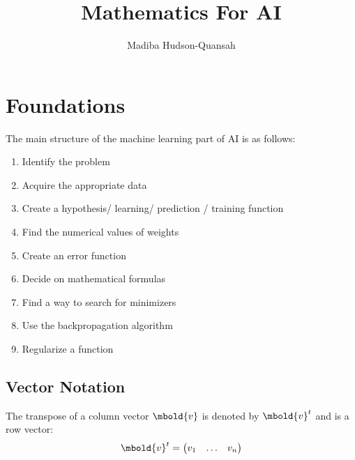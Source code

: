 \documentclass[12pt letter]{report}
\title{\Huge{Mathematics For AI}}
\author{\huge{Madiba Hudson-Quansah}}
\date{}
\begin{document}
\maketitle
\newpage
{}
\tableofcontents
\pagebreak

\chapter{Foundations}

The main structure of the machine learning part of AI is as follows:
\begin{enumerate}
  \item Identify the problem
  \item Acquire the appropriate data
  \item Create a hypothesis/ learning/ prediction / training function
  \item Find the numerical values of weights
  \item Create an error function
  \item Decide on mathematical formulas
  \item Find a way to search for minimizers
  \item Use the backpropagation algorithm
  \item Regularize a function
\end{enumerate}

\section{Vector Notation}


The transpose of a column vector $\mbold{v}$ is denoted by $\mbold{v}^t$ and is a row vector:
\[
  \mbold{v}^t = \begin{pmatrix} v_1 & \ldots & v_n \end{pmatrix}
\]
\end{document}
